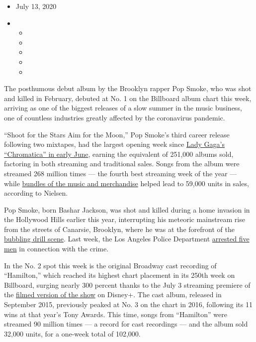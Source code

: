 \begin{itemize}
\item
  July 13, 2020
\item
  \begin{itemize}
  \item
  \item
  \item
  \item
  \item
  \end{itemize}
\end{itemize}

The posthumous debut album by the Brooklyn rapper Pop Smoke, who was
shot and killed in February, debuted at No. 1 on the Billboard album
chart this week, arriving as one of the biggest releases of a slow
summer in the music business, one of countless industries greatly
affected by the coronavirus pandemic.

``Shoot for the Stars Aim for the Moon,'' Pop Smoke's third career
release following two mixtapes, had the largest opening week since
\href{https://www.nytimes3xbfgragh.onion/2020/06/08/arts/music/lady-gaga-chromatica-billboard.html}{Lady
Gaga's ``Chromatica'' in early June}, earning the equivalent of 251,000
albums sold, factoring in both streaming and traditional sales. Songs
from the album were streamed 268 million times --- the fourth best
streaming week of the year --- while
\href{https://www.nytimes3xbfgragh.onion/2019/06/09/business/media/billboard-charts-bundles.html}{bundles
of the music and merchandise} helped lead to 59,000 units in sales,
according to Nielsen.

Pop Smoke, born Bashar Jackson, was shot and killed during a home
invasion in the Hollywood Hills earlier this year, interrupting his
meteoric mainstream rise from the streets of Canarsie, Brooklyn, where
he was at the forefront of the
\href{https://www.nytimes3xbfgragh.onion/2020/06/30/arts/music/fivio-foreign-big-drip-brooklyn-drill.html}{bubbling
drill scene}. Last week, the Los Angeles Police Department
\href{https://www.nytimes3xbfgragh.onion/2020/07/09/arts/music/pop-smoke-arrests.html}{arrested
five men} in connection with the crime.

In the No. 2 spot this week is the original Broadway cast recording of
``Hamilton,'' which reached its highest chart placement in its 250th
week on Billboard, surging nearly 300 percent thanks to the July 3
streaming premiere of the
\href{https://www.nytimes3xbfgragh.onion/2020/06/30/movies/hamilton-review-disney-plus.html}{filmed
version of the show} on Disney+. The cast album, released in September
2015, previously peaked at No. 3 on the chart in 2016, following its 11
wins at that year's Tony Awards. This time, songs from ``Hamilton'' were
streamed 90 million times --- a record for cast recordings --- and the
album sold 32,000 units, for a one-week total of 102,000.

